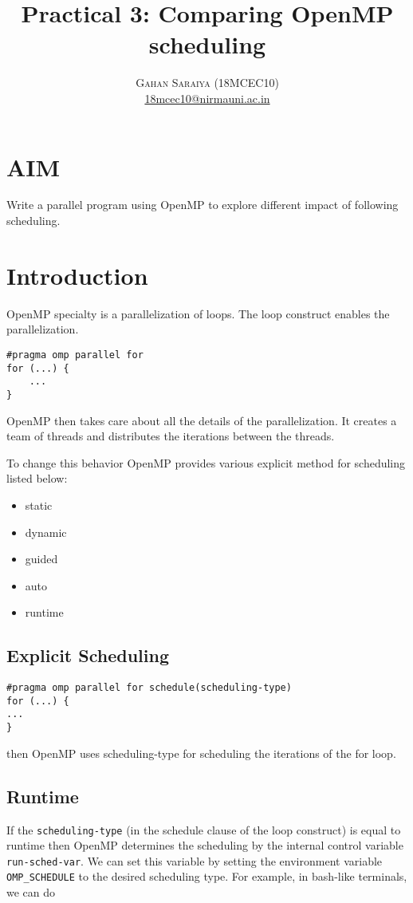 \documentclass[paper=letter, fontsize=12pt]{article}
\title{\vspace{-15mm}\fontsize{24pt}{10pt}\selectfont\textbf{Practical 3: Comparing OpenMP scheduling}} %
\author{
\large
{\textsc{Gahan Saraiya (18MCEC10)}}\\[2mm]
\normalsize \href{mailto:18mcec10@nirmauni.ac.in}{18mcec10@nirmauni.ac.in}\\[2mm] %
}
\date{}
\begin{document}
\maketitle %
\thispagestyle{fancy} %

\section{AIM}
Write a parallel program using OpenMP to explore different impact of following scheduling. 

\section{Introduction}
OpenMP specialty is a parallelization of loops. The loop construct enables the parallelization.
\begin{verbatim}
#pragma omp parallel for
for (...) { 
    ... 
}
\end{verbatim}
OpenMP then takes care about all the details of the parallelization. It creates a team of threads and distributes the iterations between the threads.

To change this behavior OpenMP provides various explicit method for scheduling listed below:
\begin{itemize}
    \item static
    \item dynamic
    \item guided
    \item auto
    \item runtime
\end{itemize}

\subsection{Explicit Scheduling}
\begin{verbatim}
#pragma omp parallel for schedule(scheduling-type)
for (...) { 
... 
}
\end{verbatim}
then OpenMP uses scheduling-type for scheduling the iterations of the for loop.

\subsection{Runtime}
If the \verb|scheduling-type| (in the schedule clause of the loop construct) is equal to runtime then OpenMP determines the scheduling by the internal control variable \verb|run-sched-var|. We can set this variable by setting the environment variable \verb|OMP_SCHEDULE| to the desired scheduling type. For example, in bash-like terminals, we can do
\end{document}

